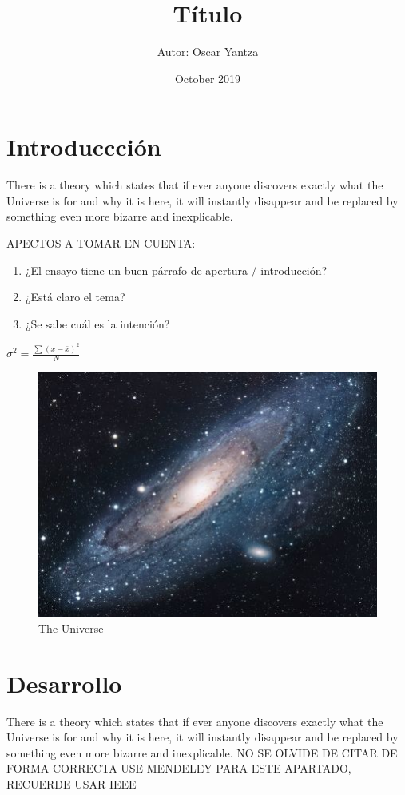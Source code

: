 \documentclass{article}
\title{Título}
\author{Autor: Oscar Yantza}
\date{October 2019}
\begin{document}
\maketitle

\section{Introduccción}
There is a theory which states that if ever anyone discovers exactly what the Universe is for and why it is here, it will instantly disappear and be replaced by something even more bizarre and inexplicable.\n

APECTOS A TOMAR EN CUENTA:
\begin{enumerate}
    \item ¿El ensayo tiene un buen párrafo de apertura / introducción?
    \item ¿Está claro el tema?
    \item ¿Se sabe cuál es la intención?
\end{enumerate}
$\sigma^{2}=\frac{\sum(x-\bar{x})^{2}}{N}$

\begin{figure}[h!]
\centering
\includegraphics[scale=1.7]{universe}
\caption{The Universe}
\label{fig:universe}
\end{figure}


\section{Desarrollo}

There is a theory which states that if ever anyone discovers exactly what the Universe is for and why it is here, it will instantly disappear and be replaced by something even more bizarre and inexplicable.\n
NO SE OLVIDE DE CITAR DE FORMA CORRECTA USE MENDELEY PARA ESTE APARTADO, RECUERDE USAR IEEE
\end{document}
